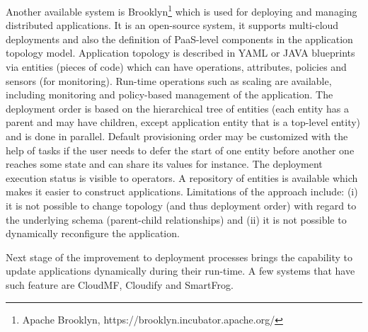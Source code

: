 \noindent 

\noindent Another available system is Brooklyn\footnote{ Apache Brooklyn, $  $https://brooklyn.incubator.apache.org/} which is used for deploying and managing distributed applications. It is an open-source system, it supports multi-cloud deployments and also the definition of PaaS-level components in the application topology model. Application topology is described in YAML or JAVA blueprints via entities (pieces of code) which can have operations, attributes, policies and sensors (for monitoring). Run-time operations such as scaling are available, including monitoring and policy-based management of the application. The deployment order is based on the hierarchical tree of entities (each entity has a parent and may have children, except application entity that is a top-level entity) and is done in parallel. Default provisioning order may be customized with the help of tasks if the user needs to defer the start of one entity before another one reaches some state and can share its values for instance. The deployment execution status is visible to operators. A repository of entities is available which makes it easier to construct applications. Limitations of the approach include: (i) it is not possible to change topology (and thus deployment order) with regard to the underlying schema (parent-child relationships) and (ii) it is not possible to dynamically reconfigure the application.

\noindent 

\noindent Next stage of the improvement to deployment processes brings the capability to update applications dynamically during their run-time. A few systems that have such feature are CloudMF, Cloudify and SmartFrog.

\noindent 

\noindent 

